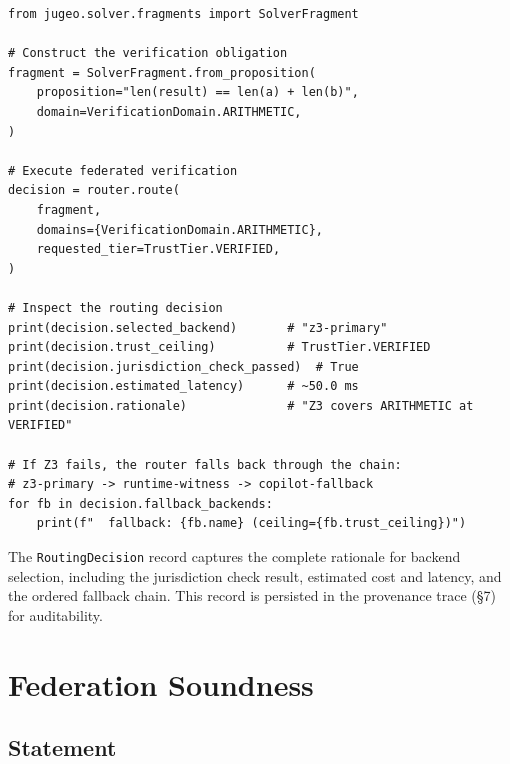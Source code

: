 \documentclass[11pt]{article}
\begin{document}
\begin{lstlisting}[style=jugeo-python, caption={%
  Executing a federated verification query and inspecting the result.}]
from jugeo.solver.fragments import SolverFragment

# Construct the verification obligation
fragment = SolverFragment.from_proposition(
    proposition="len(result) == len(a) + len(b)",
    domain=VerificationDomain.ARITHMETIC,
)

# Execute federated verification
decision = router.route(
    fragment,
    domains={VerificationDomain.ARITHMETIC},
    requested_tier=TrustTier.VERIFIED,
)

# Inspect the routing decision
print(decision.selected_backend)       # "z3-primary"
print(decision.trust_ceiling)          # TrustTier.VERIFIED
print(decision.jurisdiction_check_passed)  # True
print(decision.estimated_latency)      # ~50.0 ms
print(decision.rationale)              # "Z3 covers ARITHMETIC at VERIFIED"

# If Z3 fails, the router falls back through the chain:
# z3-primary -> runtime-witness -> copilot-fallback
for fb in decision.fallback_backends:
    print(f"  fallback: {fb.name} (ceiling={fb.trust_ceiling})")
\end{lstlisting}

The \texttt{RoutingDecision} record captures the complete rationale for
backend selection, including the jurisdiction check result, estimated cost
and latency, and the ordered fallback chain.  This record is persisted in
the provenance trace (§7) for auditability.

\section{Federation Soundness}\label{sec:soundness}

\subsection{Statement}
\end{document}
